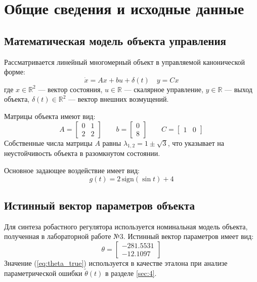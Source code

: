 \documentclass[a4paper,12pt]{article}
\begin{document}
	\newpage
	\tableofcontents
	
	
\newpage
\section{Общие сведения и исходные данные}

\subsection{Математическая модель объекта управления}
Рассматривается линейный многомерный объект в управляемой канонической форме:
\begin{equation}
	\dot{x} = Ax + bu + \delta(t) \quad y = Cx
	\label{eq:o}
\end{equation}
где $x \in \mathbb{R}^2$ --- вектор состояния, $u \in \mathbb{R}$ --- скалярное управление, $y \in \mathbb{R}$ --- выход объекта, $\delta(t) \in \mathbb{R}^2$ --- вектор внешних возмущений.

Матрицы объекта имеют вид:
\begin{equation}
	A = \begin{bmatrix} 0 & 1 \\ 2 & 2 \end{bmatrix} \qquad 
	b = \begin{bmatrix} 0 \\ 8 \end{bmatrix} \qquad 
	C = \begin{bmatrix} 1 & 0 \end{bmatrix}
\end{equation}
Собственные числа матрицы $A$ равны $\lambda_{1,2} = 1 \pm \sqrt{3}$, что указывает на неустойчивость объекта в разомкнутом состоянии.

Основное задающее воздействие имеет вид:
\begin{equation}
	g(t) = 2\,\text{sign}(\sin t) + 4
\end{equation}

\subsection{Истинный вектор параметров объекта}
Для синтеза робастного регулятора используется номинальная модель объекта, полученная в лабораторной работе №3. Истинный вектор параметров имеет вид:
\begin{equation}
	\theta = \begin{bmatrix} -281.5531 \\ -12.1097 \end{bmatrix}
	\label{eq:theta_true}
\end{equation}
Значение (\ref{eq:theta_true}) используется в качестве эталона при анализе параметрической ошибки $\tilde{\theta}(t)$ в разделе \ref{sec:4}.
\end{document}
